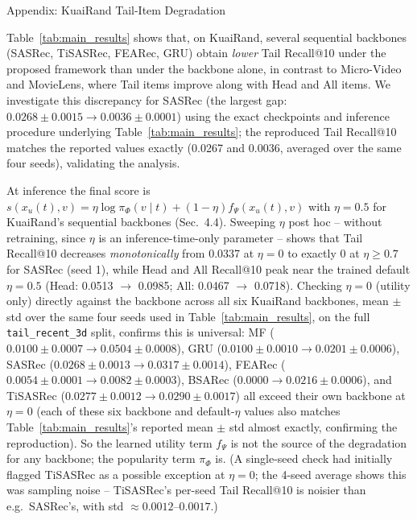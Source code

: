 Appendix: KuaiRand Tail-Item Degradation

Table~\ref{tab:main_results} shows that, on KuaiRand, several sequential backbones (SASRec,
TiSASRec, FEARec, GRU) obtain \emph{lower} Tail Recall@10 under the proposed framework than
under the backbone alone, in contrast to Micro-Video and MovieLens, where Tail items improve
along with Head and All items. We investigate this discrepancy for SASRec (the largest gap:
$0.0268\pm0.0015 \to 0.0036\pm0.0001$) using the exact checkpoints and inference procedure
underlying Table~\ref{tab:main_results}; the reproduced Tail Recall@10 matches the reported
values exactly (0.0267 and 0.0036, averaged over the same four seeds), validating the analysis.

At inference the final score is $s(x_u(t),v) = \eta\log\pi_\Phi(v\mid t) + (1-\eta)f_\Psi(x_u(t),v)$
with $\eta=0.5$ for KuaiRand's sequential backbones (Sec.~4.4). Sweeping $\eta$ post hoc --
without retraining, since $\eta$ is an inference-time-only parameter -- shows that Tail
Recall@10 decreases \emph{monotonically} from 0.0337 at $\eta=0$ to exactly 0 at $\eta \ge 0.7$
for SASRec (seed 1), while Head and All Recall@10 peak near the trained default $\eta=0.5$ (Head:
0.0513 $\to$ 0.0985; All: 0.0467 $\to$ 0.0718). Checking $\eta=0$ (utility only) directly against
the backbone across all six KuaiRand backbones, mean $\pm$ std over the same four seeds used in
Table~\ref{tab:main_results}, on the full \texttt{tail\_recent\_3d} split, confirms this is
universal: MF ($0.0100\pm0.0007\to0.0504\pm0.0008$), GRU ($0.0100\pm0.0010\to0.0201\pm0.0006$),
SASRec ($0.0268\pm0.0013\to0.0317\pm0.0014$), FEARec ($0.0054\pm0.0001\to0.0082\pm0.0003$),
BSARec ($0.0000\to0.0216\pm0.0006$), and TiSASRec ($0.0277\pm0.0012\to0.0290\pm0.0017$) all
exceed their own backbone at $\eta=0$ (each of these six backbone and default-$\eta$ values also
matches Table~\ref{tab:main_results}'s reported mean $\pm$ std almost exactly, confirming the
reproduction). So the learned utility term $f_\Psi$ is not the source of the degradation for any
backbone; the popularity term $\pi_\Phi$ is. (A single-seed check had initially flagged TiSASRec
as a possible exception at $\eta=0$; the 4-seed average shows this was sampling noise -- TiSASRec's
per-seed Tail Recall@10 is noisier than e.g.\ SASRec's, with std $\approx 0.0012$--$0.0017$.)


